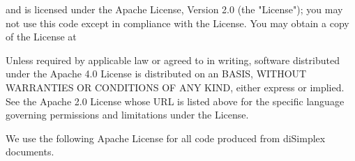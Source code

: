 {\blank[small]

\startcenteraligned
{}
\stopcenteraligned

\blank[small]

and is licensed under the Apache License, Version 2.0 (the "License");
you may not use this code except in compliance with the License. You may
obtain a copy of the License at

\blank[small]

\startcenteraligned
{}
\stopcenteraligned

\blank[small]

Unless required by applicable law or agreed to in writing, software
distributed under the Apache 4.0 License is distributed on an  BASIS, WITHOUT WARRANTIES OR CONDITIONS OF ANY KIND, either express
or implied. See the Apache 2.0 License whose URL is listed above for the
specific language governing permissions and limitations under the
License.

\stopmakeup
}
\stopMkIVCode

We use the following Apache License for all code produced from diSimplex 
documents.

\startMkIVCode
\def\placeMkIVCopyright#1{\addApacheLicense{MkIVCode}{}{#1}}

\def\placeLuaCopyright#1{\addApacheLicense{LuaCode}{--}{#1}}

\def\placeCHeaderCopyright#1{\addApacheLicense{CHeader}{//}{#1}}
\def\placeCCodeCopyright#1{\addApacheLicense{CCode}{//}{#1}}
\def\addCTestCopyright#1{\addCTestApacheLicense{default}{#1}}

\def\placeJoylolCodeCopyright#1{\addApacheLicense{JoylolCode}{//}{#1}}
\def\placeJoylolCopyright#1{\addApacheLicense{Joylol}{//}{#1}}

\def\placeLmsfileCopyright#1{\addApacheLicense{Lmsfile}{--}{#1}}
\stopMkIVCode


